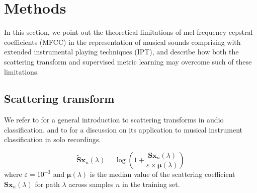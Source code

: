 \documentclass{article}
\begin{document}







\section{Methods}
In this section, we point out the theoretical limitations of mel-frequency cepstral coefficients (MFCC) in the representation of musical sounds comprising with extended instrumental playing techniques (IPT), and describe how both the scattering transform and supervised metric learning may overcome such of these limitations.


\subsection{Scattering transform} %


We refer to \cite{anden2014taslp} for a general introduction to scattering transforms in audio classification, and to \cite{lostanlen2017phd} for a discussion on its application to musical instrument classification in solo recordings.
\cite{anden2012dafx}

\begin{equation}
\widetilde{\mathbf{S}} \boldsymbol{x}_n(\lambda) =
\log \left(
1 + \dfrac{\mathbf{S}\boldsymbol{x}_n(\lambda)}{\varepsilon \times \boldsymbol{\mu}(\lambda)}
\right)
\end{equation}
where $\varepsilon = 10^{-3}$ and $\boldsymbol{\mu}(\lambda)$ is the median value of the scattering coefficient $\mathbf{S}\boldsymbol{x}_n (\lambda)$ for path $\lambda$ across samples $n$ in the training set.
\end{document}
